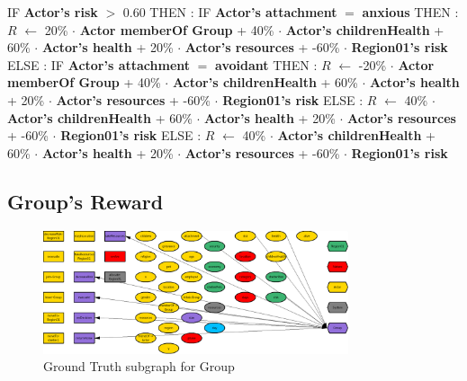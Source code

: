 \documentclass{article}%
\begin{document}
%
\begin{flushleft}%
IF %
\textbf{Actor's risk}%
$>$%
0.60%
\linebreak%
\hspace*{2em}%
THEN %
: %
IF %
\textbf{Actor's attachment}%
$=$%
\textbf{anxious}%
\linebreak%
\hspace*{4em}%
THEN %
: %
$R$%
$\leftarrow$%
20\%%
$\cdot$%
\textbf{Actor memberOf Group}%
+%
40\%%
$\cdot$%
\textbf{Actor's childrenHealth}%
+%
60\%%
$\cdot$%
\textbf{Actor's health}%
+%
20\%%
$\cdot$%
\textbf{Actor's resources}%
+%
{-}60\%%
$\cdot$%
\textbf{Region01's risk}%
\linebreak%
\hspace*{4em}%
ELSE %
: %
IF %
\textbf{Actor's attachment}%
$=$%
\textbf{avoidant}%
\linebreak%
\hspace*{6em}%
THEN %
: %
$R$%
$\leftarrow$%
{-}20\%%
$\cdot$%
\textbf{Actor memberOf Group}%
+%
40\%%
$\cdot$%
\textbf{Actor's childrenHealth}%
+%
60\%%
$\cdot$%
\textbf{Actor's health}%
+%
20\%%
$\cdot$%
\textbf{Actor's resources}%
+%
{-}60\%%
$\cdot$%
\textbf{Region01's risk}%
\linebreak%
\hspace*{6em}%
ELSE %
: %
$R$%
$\leftarrow$%
40\%%
$\cdot$%
\textbf{Actor's childrenHealth}%
+%
60\%%
$\cdot$%
\textbf{Actor's health}%
+%
20\%%
$\cdot$%
\textbf{Actor's resources}%
+%
{-}60\%%
$\cdot$%
\textbf{Region01's risk}%
\linebreak%
\hspace*{2em}%
ELSE %
: %
$R$%
$\leftarrow$%
40\%%
$\cdot$%
\textbf{Actor's childrenHealth}%
+%
60\%%
$\cdot$%
\textbf{Actor's health}%
+%
20\%%
$\cdot$%
\textbf{Actor's resources}%
+%
{-}60\%%
$\cdot$%
\textbf{Region01's risk}%
\end{flushleft}

%
\subsection{Group's Reward}%
\label{subsec:Group's Reward}%


\begin{figure}[ht]%
\centering%
\includegraphics[width=0.8\textwidth]{images/Group.png}%
\caption{Ground Truth subgraph for Group}%
\end{figure}
\end{document}
